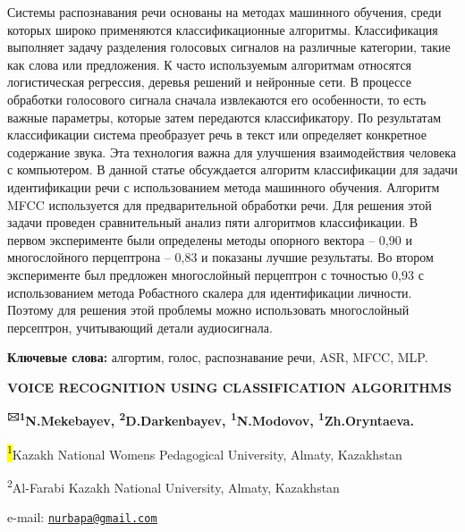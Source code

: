 \documentclass[
]{article}
\begin{document}
Системы распознавания речи основаны на методах машинного обучения, среди
которых широко применяются классификационные алгоритмы. Классификация
выполняет задачу разделения голосовых сигналов на различные категории,
такие как слова или предложения. К часто используемым алгоритмам
относятся логистическая регрессия, деревья решений и нейронные сети. В
процессе обработки голосового сигнала сначала извлекаются его
особенности, то есть важные параметры, которые затем передаются
классификатору. По результатам классификации система преобразует речь в
текст или определяет конкретное содержание звука. Эта технология важна
для улучшения взаимодействия человека с компьютером. В данной статье
обсуждается алгоритм классификации для задачи идентификации речи с
использованием метода машинного обучения. Алгоритм MFCC используется для
предварительной обработки речи. Для решения этой задачи проведен
сравнительный анализ пяти алгоритмов классификации. В первом
эксперименте были определены методы опорного вектора -- 0,90 и
многослойного перцептрона -- 0,83 и показаны лучшие результаты. Во
втором эксперименте был предложен многослойный перцептрон с точностью
0,93 с использованием метода Робастного скалера для идентификации
личности. Поэтому для решения этой проблемы можно использовать
многослойный персептрон, учитывающий детали аудиосигнала.

\textbf{Ключевые слова:} алгортим, голос, распознавание речи, ASR, MFCC,
MLP.

\textbf{VOICE RECOGNITION USING CLASSIFICATION ALGORITHMS}

\textbf{\textsuperscript{🖂1}N.Mekebayev,
\textsuperscript{2}D.Darkenbayev, \textsuperscript{1}N.Modovov,
\textsuperscript{1}Zh.Oryntaeva.}

\hl{\textsuperscript{1}}Kazakh National Women\textquotesingle s
Pedagogical University, Almaty, Kazakhstan

\textsuperscript{2}Al-Farabi Kazakh National University, Almaty,
Kazakhstan

e-mail:
\ul{\href{mailto:nurbapa@gmail.com}{\nolinkurl{nurbapa@gmail.com}}}
\end{document}
